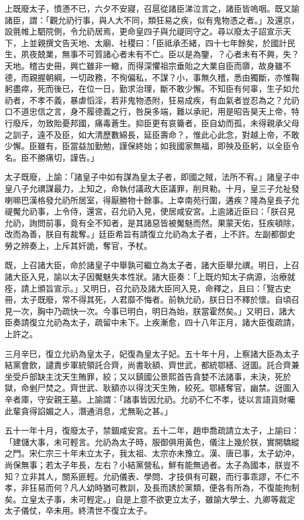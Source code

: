 \begin{pinyinscope}
上既廢太子，憤懣不已，六夕不安寢，召扈從諸臣涕泣言之，諸臣皆嗚咽。既又諭諸臣，謂：「觀允礽行事，與人大不同，類狂易之疾，似有鬼物憑之者。」及還京，設氈帷上駟院側，令允礽居焉，更命皇四子與允禔同守之。尋以廢太子詔宣示天下，上並親撰文告天地、太廟、社稷曰：「臣祗承丕緒，四十七年餘矣，於國計民生，夙夜兢業，無事不可質諸心者未有不亡。臣以是為鑒，？心者未有不興，失？天地。稽古史冊，興亡雖非一轍，而得深懼祖宗垂貽之大業自臣而隳，故身雖不德，而親握朝綱，一切政務，不徇偏私，不謀？小，事無久稽，悉由獨斷，亦惟鞠躬盡瘁，死而後已，在位一日，勤求治理，斷不敢少懈。不知臣有何辜，生子如允礽者，不孝不義，暴虐慆淫，若非鬼物憑附，狂易成疾，有血氣者豈忍為之？允礽口不道忠信之言，身不履德義之行，咎戾多端，難以承祀，用是昭告昊天上帝，特行廢斥，勿致貽憂邦國，痛毒蒼生。抑臣更有哀籥者，臣自幼而孤，未得親承父母之訓子，遠不及臣，如大清歷數綿長，延臣壽命？，惟此心此念，對越上帝，不敢少懈。臣雖有，臣當益加勤勉，謹保終始；如我國家無福，即殃及臣躬，以全臣令名。臣不勝痛切，謹告。」

太子既廢，上諭：「諸皇子中如有謀為皇太子者，即國之賊，法所不宥。」諸皇子中皇八子允禩謀最力，上知之，命執付議政大臣議罪，削貝勒。十月，皇三子允祉發喇嘛巴漢格發允礽所居室，得厭勝物十餘事。上幸南苑行圍，遘疾？隆為皇長子允禔魘允礽事，上令侍，還宮，召允礽入見，使居咸安宮。上逾諸近臣曰：「朕召見允礽，詢問前事，竟有全不知者，是其諸惡皆被魘魅而然。果蒙天佑，狂疾頓除，改而為善，朕自有裁奪。」廷臣希旨有請復立允礽為太子者，上不許。左副都御史勞之辨奏上，上斥其奸詭，奪官，予杖。

既，上召諸大臣，命於諸皇子中舉孰可繼立為太子者，諸大臣舉允禩。明日，上召諸大臣入見，諭以太子因魘魅失本性狀。諸大臣奏：「上既灼知太子病源，治療就痊，請上頒旨宣示。」又明日，召允礽及諸大臣同入見，命釋之，且曰：「覽古史冊，太子既廢，常不得其死，人君靡不悔者。前執允礽，朕日日不釋於懷。自頃召見一次，胸中乃疏快一次。今事已明白，明日為始，朕當霍然矣。」又明日，諸大臣奏請復立允礽為太子，疏留中未下。上疾漸愈，四十八年正月，諸大臣復疏請，上許之。

三月辛巳，復立允礽為皇太子，妃復為皇太子妃。五十年十月，上察諸大臣為太子結黨會飲，譴責步軍統領託合齊，尚書耿額、齊世武，都統鄂繕、迓圖。託合齊兼坐受戶部缺主沈天生賄罪，絞；又以鎮國公景熙首告貪婪不法諸事，未決，死於獄，命剉尸焚之。齊世武、耿額亦以得沈天生賄，絞死。鄂繕奪官，幽禁。迓圖入辛者庫，守安親王墓。上諭謂：「諸事皆因允礽。允礽不仁不孝，徒以言語貨財囑此輩貪得諂媚之人，潛通消息，尤無恥之甚。」

五十一年十月，復廢太子，禁錮咸安宮。五十二年，趙申喬疏請立太子，上諭曰：「建儲大事，未可輕言。允礽為太子時，服御俱用黃色，儀注上幾於朕，實開驕縱之門。宋仁宗三十年未立太子，我太祖、太宗亦未豫立。漢、唐已事，太子幼沖，尚保無事；若太子年長，左右？小結黨營私，鮮有能無過者。太子為國本，朕豈不知？立非其人，關系匪輕。允礽儀表、學問、才技俱有可觀，而行事乖謬，不仁不孝，非狂易而何？凡人幼時猶可教訓，及長而誘於黨類，便各有所為，不復能拘制矣。立皇太子事，未可輕定。」自是上意不欲更立太子，雖諭大學士、九卿等裁定太子儀仗，卒未用。終清世不復立太子。


\end{pinyinscope}
